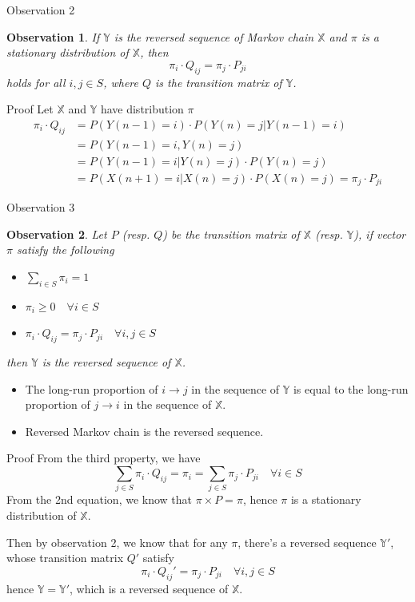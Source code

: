 \documentclass[mathserif]{beamer}
\newtheorem{obs}{Observation}
\begin{document}
\begin{frame}{Observation 2}
\begin{obs}
If $\mathbb{Y}$ is the reversed sequence of Markov chain $\mathbb{X}$ and $\pi$ is a stationary distribution of $\mathbb{X}$, then
\[
\pi_i \cdot Q_{ij} = \pi_j \cdot P_{ji}
\]
holds for all $i,j \in S$, where $Q$ is the transition matrix of $\mathbb{Y}$.
\end{obs}
\end{frame}

\begin{frame}{Proof}
Let $\mathbb{X}$ and $\mathbb{Y}$ have distribution $\pi$
\begin{align*}
\pi_i \cdot Q_{ij} & = P(Y(n-1)=i)\cdot P(Y(n)=j|Y(n-1)=i) \\
& = P(Y(n-1)=i, Y(n)=j) \\
& = P(Y(n-1)=i|Y(n)=j)\cdot P(Y(n)=j) \\
& = P(X(n+1)=i|X(n)=j)\cdot P(X(n)=j) = \pi_j \cdot P_{ji}
\end{align*}
\end{frame}

\begin{frame}{Observation 3}\label{obs3}
\begin{obs}
Let $P$ (resp. $Q$) be the transition matrix of $\mathbb{X}$ (resp. $\mathbb{Y}$),
if vector $\pi$ satisfy the following
\begin{itemize}
\item $\sum_{i\in S} \pi_i = 1$
\item $\pi_i \geq 0 \quad\forall i \in S$
\item $\pi_i \cdot Q_{ij} = \pi_j \cdot P_{ji} \quad\forall i,j \in S$
\end{itemize}
then $\mathbb{Y}$ is the reversed sequence of $\mathbb{X}$.
\end{obs}
\begin{itemize}
\item The long-run proportion of $i\to j$ in the sequence of $\mathbb{Y}$ is equal to the long-run proportion of $j\to i$ in the sequence of $\mathbb{X}$.
\item Reversed Markov chain is the reversed sequence.
\end{itemize}
\end{frame}

\begin{frame}{Proof}
From the third property, we have
\[
\sum_{j\in S} \pi_i \cdot Q_{ij} = \pi_i = \sum_{j\in S} \pi_j \cdot P_{ji} \quad\forall i \in S
\]
From the 2nd equation, we know that $\pi \times P = \pi$, hence $\pi$ is a stationary distribution of $\mathbb{X}$.

Then by observation 2, we know that for any $\pi$, there's a reversed sequence $\mathbb{Y}'$, whose transition matrix $Q'$ satisfy
\[
\pi_i \cdot Q_{ij}' = \pi_j \cdot P_{ji} \quad\forall i,j \in S
\]
hence $\mathbb{Y} = \mathbb{Y}'$, which is a reversed sequence of $\mathbb{X}$.
\end{frame}
\end{document}

